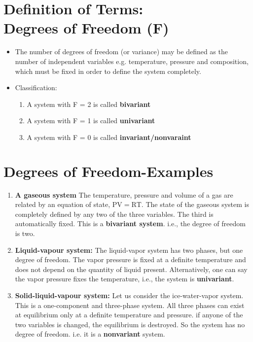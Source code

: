 \documentclass[a4paper,12pt,twocolumn]{article}
\begin{document}
\section{Definition of Terms: \\ Degrees of Freedom (F)}
\begin{itemize}
\item The number of degrees of freedom (or variance) may be defined as the number of independent variables e.g. temperature, pressure and composition, which must be fixed in order to define the system completely.
\item Classification:
    \begin{enumerate}
    \item A system with F = 2 is called \textbf{bivariant} 
    \item A system with F = 1 is called \textbf{univariant}
    \item A system with F = 0 is called  \textbf{invariant/nonvaraint}
    \end{enumerate}
\end{itemize}

\section{Degrees of Freedom-Examples}
\begin{enumerate}
\item \textbf{A gaseous system} The temperature, pressure and volume of a gas are related by an equation of state, $\mathrm{PV = RT}$. The state of the gaseous system is completely defined by any two of the three variables. The third is automatically fixed. This is a \textbf{bivariant system}. i.e., the degree of freedom is two. 
\item \textbf{Liquid-vapour system:} The liquid-vapor system has two phases, but one degree of freedom. The vapor pressure is fixed at a definite temperature and does not depend on the quantity of liquid present. Alternatively, one can say the vapor pressure fixes the temperature, i.e., the system is \textbf{univariant}. 
\item \textbf{Solid-liquid-vapour system:} Let us consider the ice-water-vapor system. This is a one-component and three-phase system. All three phases can exist at equilibrium only at a definite temperature and pressure. if anyone of the two variables is changed, the equilibrium is destroyed. So the system has no degree of freedom. i.e. it is a \textbf{nonvariant} system.
\end{enumerate}
\end{document}
